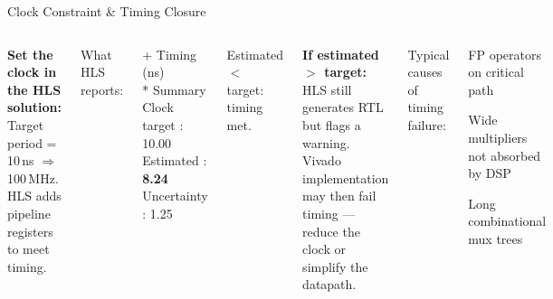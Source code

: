 \documentclass[aspectratio=169,12pt]{beamer}
\begin{document}
\begin{frame}{Clock Constraint \& Timing Closure}
\vspace{0.1cm}
\begin{columns}[T,totalwidth=\textwidth]


  \colorbox{Navy!8}{\parbox{\dimexpr\linewidth-2\fboxsep\relax}{\vspace{4pt}
    {\color{Navy}\bfseries Set the clock in the HLS solution:}\\[3pt]
    {\small Target period = 10\,ns $\Rightarrow$ 100\,MHz.\\
    HLS adds pipeline registers to meet timing.}
  \vspace{4pt}}}

  \vspace{8pt}
  {\small\color{Navy}What HLS reports:}
  \vspace{3pt}

  \colorbox{NavyDk!6}{\parbox{\dimexpr\linewidth-2\fboxsep\relax}{
  \ttfamily\fontsize{7.5}{10}\selectfont\color{NavyDk}
  + Timing (ns)\\
  \hspace{1em}* Summary\\
  \hspace{2em}Clock target   : 10.00\\
  \hspace{2em}Estimated      : \textbf{\color{Teal}8.24}\\
  \hspace{2em}Uncertainty    : 1.25
  }}

  \vspace{8pt}
  {\small\color{GreenHi}Estimated $<$ target: timing met.}


  \vspace{0.1cm}

  \colorbox{Orange!10}{\parbox{\dimexpr\linewidth-2\fboxsep\relax}{\vspace{4pt}
    {\color{Orange}\bfseries If estimated $>$ target:}\\[2pt]
    {\small HLS still generates RTL but flags a warning.
    Vivado implementation may then fail timing — reduce
    the clock or simplify the datapath.}
  \vspace{4pt}}}

  \vspace{8pt}
  {\small\color{Navy}Typical causes of timing failure:}
  \begin{itemize}\setlength{\itemsep}{1pt}
    {\small
    \item FP operators on critical path
    \item Wide multipliers not absorbed by DSP
    \item Long combinational mux trees}
  \end{itemize}

\end{columns}
\end{frame}
\end{document}
